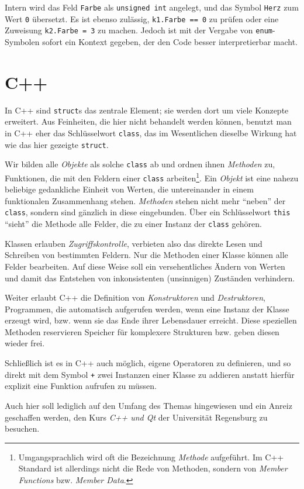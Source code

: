 Intern wird das Feld \texttt{Farbe} als \texttt{unsigned int} angelegt, und das Symbol \texttt{Herz} zum Wert \texttt{0} übersetzt. Es ist ebenso zulässig, \texttt{k1.Farbe == 0} zu prüfen oder eine Zuweisung \texttt{k2.Farbe = 3} zu machen. Jedoch ist mit der Vergabe von \texttt{enum}-Symbolen sofort ein Kontext gegeben, der den Code besser interpretierbar macht.

\section{C++}
\begin{plusbox}
In C++ sind \texttt{struct}s das zentrale Element; sie werden dort um viele Konzepte erweitert. Aus Feinheiten, die hier nicht behandelt werden können, benutzt man in C++ eher das Schlüsselwort \texttt{class}, das im Wesentlichen dieselbe Wirkung hat wie das hier gezeigte \texttt{struct}.

Wir bilden alle \emph{Objekte} als solche \texttt{class} ab und ordnen ihnen \emph{Methoden} zu, \ie Funktionen, die mit den Feldern einer \texttt{class} arbeiten\footnote{Umgangsprachlich wird oft die Bezeichnung \emph{Methode} aufgeführt. Im C++ Standard ist allerdings nicht die Rede von Methoden, sondern von \emph{Member Functions} bzw. \emph{Member Data}.}. Ein \emph{Objekt} ist eine nahezu beliebige gedankliche Einheit von Werten, die untereinander in einem funktionalen Zusammenhang stehen. \emph{Methoden} stehen nicht mehr \enquote{neben} der \texttt{class}, sondern sind gänzlich in diese eingebunden. Über ein Schlüsselwort \texttt{this} \enquote{sieht} die Methode alle Felder, die zu einer Instanz der \texttt{class} gehören.

Klassen erlauben \emph{Zugriffskontrolle}, verbieten also das direkte Lesen und Schreiben von bestimmten Feldern. Nur die Methoden einer Klasse können alle Felder bearbeiten. Auf diese Weise soll ein versehentliches Ändern von Werten und damit das Entstehen von inkonsistenten (unsinnigen) Zuständen verhindern.

Weiter erlaubt C++ die Definition von \emph{Konstruktoren} und \emph{Destruktoren}, \ie Programmen, die automatisch aufgerufen werden, wenn eine Instanz der Klasse erzeugt wird, bzw. wenn sie das Ende ihrer Lebensdauer erreicht. Diese speziellen Methoden reservieren \idR Speicher für komplexere Strukturen bzw. geben diesen wieder frei.

Schließlich ist es in C++ auch möglich, eigene Operatoren zu definieren, und so direkt mit dem Symbol \texttt{+} zwei Instanzen einer Klasse zu addieren anstatt hierfür explizit eine Funktion aufrufen zu müssen.

Auch hier soll lediglich auf den Umfang des Themas hingewiesen und ein Anreiz geschaffen werden, den Kurs \emph{C++ und Qt} der Universität Regensburg zu besuchen.
\end{plusbox}
